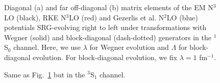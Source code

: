\documentclass[preprintnumbers,floatfix,aps,prc,preprint,nofootinbib]{revtex4-1}
\begin{document}
\begin{figure}[H]
	\centering
	
	\caption{Diagonal (a) and far off-diagonal (b) matrix elements of the EM N$^3$LO (black), RKE N$^3$LO (red) and Gezerlis et al. N$^2$LO (blue) potentials SRG-evolving right to left under transformations with Wegner (solid) and block-diagonal (dash-dotted) generators in the $^1$S$_0$ channel. Here, we use $\lambda$ for Wegner evolution and $\Lambda$ for block-diagonal evolution. For block-diagonal evolution, we fix $\lambda=1$ fm$^{-1}$.}
	\label{fig:potential_slices_1S0}
\end{figure}
%
\begin{figure}[H]
	\centering
	
	\caption{Same as Fig.~\ref{fig:potential_slices_1S0} but in the $^3$S$_1$ channel.}
	\label{fig:potential_slices_3S1}
\end{figure}
\end{document}
